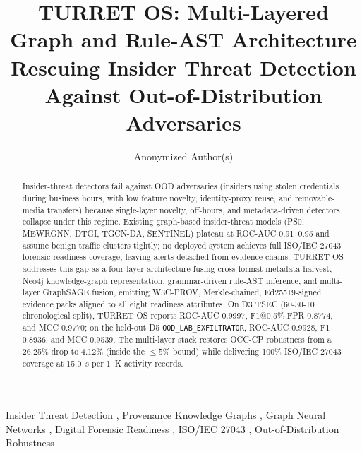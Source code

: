 \documentclass[a4paper,fleqn]{cas-dc}
\begin{document}
\let\WriteBookmarks\relax

\shorttitle{}
\shortauthors{}

\title[mode=title]{TURRET OS: Multi-Layered Graph and Rule-AST Architecture Rescuing Insider Threat Detection Against Out-of-Distribution Adversaries}

\author[1]{Anonymized Author(s)}

\begin{abstract}
Insider-threat detectors fail against OOD adversaries (insiders using stolen credentials during business hours, with low feature novelty, identity-proxy reuse, and removable-media transfers) because single-layer novelty, off-hours, and metadata-driven detectors collapse under this regime. Existing graph-based insider-threat models (PS0, MEWRGNN, DTGI, TGCN-DA, SENTINEL) plateau at ROC-AUC 0.91--0.95 and assume benign traffic clusters tightly; no deployed system achieves full ISO/IEC 27043 forensic-readiness coverage, leaving alerts detached from evidence chains. TURRET OS addresses this gap as a four-layer architecture fusing cross-format metadata harvest, Neo4j knowledge-graph representation, grammar-driven rule-AST inference, and multi-layer GraphSAGE fusion, emitting W3C-PROV, Merkle-chained, Ed25519-signed evidence packs aligned to all eight readiness attributes. On D3 TSEC (60-30-10 chronological split), TURRET OS reports ROC-AUC 0.9997, F1@0.5\% FPR 0.8774, and MCC 0.9770; on the held-out D5 \texttt{OOD\_\allowbreak LAB\_\allowbreak EXFILTRATOR}, ROC-AUC 0.9928, F1 0.8936, and MCC 0.9539. The multi-layer stack restores OCC-CP robustness from a 26.25\% drop to 4.12\% (inside the $\le 5\%$ bound) while delivering 100\% ISO/IEC 27043 coverage at 15.0~s per 1~K activity records.
\end{abstract}

\begin{keywords}
Insider Threat Detection \sep
Provenance Knowledge Graphs \sep
Graph Neural Networks \sep
Digital Forensic Readiness \sep
ISO/IEC 27043 \sep
Out-of-Distribution Robustness
\end{keywords}

\maketitle
\thispagestyle{cas}













\end{document}
